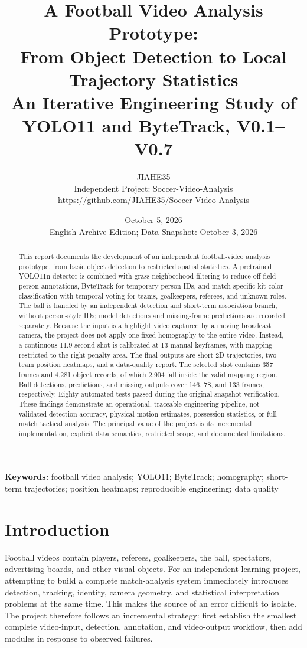 \documentclass[11pt,a4paper]{article}
\title{\textbf{A Football Video Analysis Prototype:\\
From Object Detection to Local Trajectory Statistics}\\[0.5em]
\large An Iterative Engineering Study of YOLO11 and ByteTrack, V0.1--V0.7}
\author{JIAHE35\\
  \small Independent Project: Soccer-Video-Analysis\\
  \small \url{https://github.com/JIAHE35/Soccer-Video-Analysis}}
\date{October 5, 2026\\
  \small English Archive Edition; Data Snapshot: October 3, 2026}
\begin{document}
\maketitle

\begin{abstract}
This report documents the development of an independent football-video analysis
prototype, from basic object detection to restricted spatial statistics.
A pretrained YOLO11n detector is combined with grass-neighborhood filtering
to reduce off-field person annotations, ByteTrack for temporary person IDs,
and match-specific kit-color classification with temporal voting for teams,
goalkeepers, referees, and unknown roles. The ball is handled by an independent
detection and short-term association branch, without person-style IDs; model
detections and missing-frame predictions are recorded separately.
Because the input is a highlight video captured by a moving broadcast camera,
the project does not apply one fixed homography to the entire video. Instead,
a continuous 11.9-second shot is calibrated at 13 manual keyframes, with mapping
restricted to the right penalty area. The final outputs are short 2D trajectories,
two-team position heatmaps, and a data-quality report. The selected shot contains
357 frames and 4,281 object records, of which 2,904 fall inside the valid mapping
region. Ball detections, predictions, and missing outputs cover 146, 78, and
133 frames, respectively. Eighty automated tests passed during the original
snapshot verification. These findings demonstrate an operational, traceable
engineering pipeline, not validated detection accuracy, physical motion
estimates, possession statistics, or full-match tactical analysis. The principal
value of the project is its incremental implementation, explicit data semantics,
restricted scope, and documented limitations.
\end{abstract}

\noindent\textbf{Keywords:} football video analysis; YOLO11; ByteTrack;
homography; short-term trajectories; position heatmaps; reproducible engineering;
data quality

\tableofcontents
\clearpage

\section{Introduction}

Football videos contain players, referees, goalkeepers, the ball, spectators,
advertising boards, and other visual objects. For an independent learning
project, attempting to build a complete match-analysis system immediately
introduces detection, tracking, identity, camera geometry, and statistical
interpretation problems at the same time. This makes the source of an error
difficult to isolate. The project therefore follows an incremental strategy:
first establish the smallest complete video-input, detection, annotation,
and video-output workflow, then add modules in response to observed failures.
\end{document}
